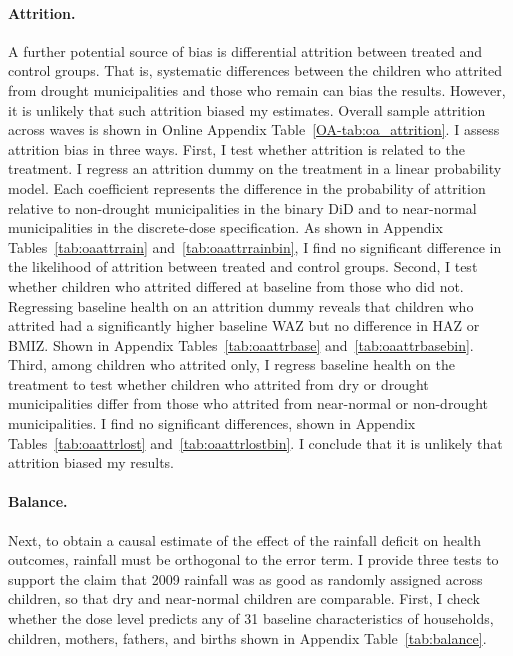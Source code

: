 \paragraph{Attrition.} A further potential source of bias is differential attrition between treated and control groups. That is, systematic differences between the children who attrited from drought municipalities and those who remain can bias the results. However, it is unlikely that such attrition biased my estimates. Overall sample attrition across waves is shown in Online Appendix Table~\ref{OA-tab:oa_attrition}. I assess attrition bias in three ways. First, I test whether attrition is related to the treatment. I regress an attrition dummy on the treatment in a linear probability model. Each coefficient represents the difference in the probability of attrition relative to non-drought municipalities in the binary DiD and to near-normal municipalities in the discrete-dose specification. As shown in Appendix Tables~\ref{tab:oaattrrain} and~\ref{tab:oaattrrainbin}, I find no significant difference in the likelihood of attrition between treated and control groups. Second, I test whether children who attrited differed at baseline from those who did not. Regressing baseline health on an attrition dummy reveals that children who attrited had a significantly higher baseline WAZ but no difference in HAZ or BMIZ. Shown in Appendix Tables~\ref{tab:oaattrbase} and~\ref{tab:oaattrbasebin}. Third, among children who attrited only, I regress baseline health on the treatment to test whether children who attrited from dry or drought municipalities differ from those who attrited from near-normal or non-drought municipalities. I find no significant differences, shown in Appendix Tables~\ref{tab:oaattrlost} and~\ref{tab:oaattrlostbin}. I conclude that it is unlikely that attrition biased my results.

\paragraph{Balance.} Next, to obtain a causal estimate of the effect of the rainfall deficit on health outcomes, rainfall must be orthogonal to the error term. I provide three tests to support the claim that 2009 rainfall was as good as randomly assigned across children, so that dry and near-normal children are comparable. First, I check whether the dose level predicts any of 31 baseline characteristics of households, children, mothers, fathers, and births shown in Appendix Table~\ref{tab:balance}.


